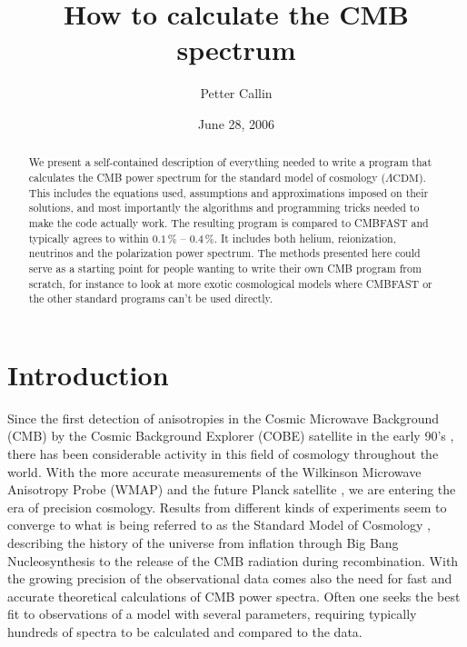 \documentclass[twocolumn,nofootinbib,amsmath,amssymb]{revtex4}
\newcommand{\lcdm}{\Lambda\mathrm{CDM}}
\begin{document}
\title{How to calculate the CMB spectrum}

\author{Petter Callin}

\date{June 28, 2006}

\begin{abstract}
We present a self-contained description of everything needed to write a program
that calculates the CMB power spectrum for the standard model of cosmology
($\lcdm$). This includes the equations used, assumptions and approximations
imposed on their solutions, and most importantly the algorithms and programming
tricks needed to make the code actually work. The resulting program is compared
to CMBFAST and typically agrees to within $0.1 \,\%$ -- $0.4 \,\%$. It includes
both helium, reionization, neutrinos and the polarization power spectrum. The
methods presented here could serve as a starting point for people wanting to
write their own CMB program from scratch, for instance to look at more exotic
cosmological models where CMBFAST or the other standard programs can't be used
directly.
\end{abstract}

\maketitle


\section{Introduction}


Since the first detection of anisotropies in the Cosmic Microwave Background
(CMB) by the Cosmic Background Explorer (COBE) satellite in the early 90's
\cite{COBE}, there has been considerable activity in this field of cosmology
throughout the world. With the more accurate measurements of the Wilkinson
Microwave Anisotropy Probe (WMAP) \cite{WMAP_firstyear, WMAP_threeyear} and the
future Planck satellite \cite{Planck}, we are entering the era of precision
cosmology. Results from different kinds of experiments seem to converge to what
is being referred to as the Standard Model of Cosmology \cite{StandardModel},
describing the history of the universe from inflation through Big Bang
Nucleosynthesis to the release of the CMB radiation during recombination. With
the growing precision of the observational data comes also the need for fast
and accurate theoretical calculations of CMB power spectra. Often one seeks the
best fit to observations of a model with several parameters, requiring
typically hundreds of spectra to be calculated and compared to the data.
\end{document}
